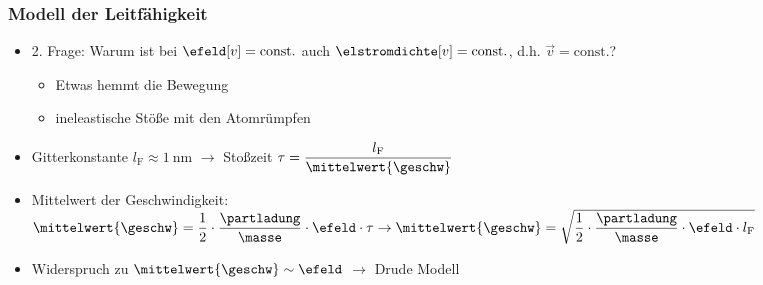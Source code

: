 \begin{frame}
  \frametitle{Modell der Leitfähigkeit}
\begin{itemize}[<+->]      
\item 2. Frage: Warum ist bei $\efeld[v] = \text{const.}$ auch $\elstromdichte[v] = \text{const.}$, d.h. $\vec{v} = \text{const.}$?
  \begin{itemize}[<+->]
  \item Etwas hemmt die Bewegung
  \item ineleastische Stöße mit den Atomrümpfen
    \end{itemize} 
\item Gitterkonstante \(l_\mathrm{F} \approx \SI{1}{\nano\metre} \) $\to$ Stoßzeit $
	\tau = \dfrac{l_\mathrm{F}}{\mittelwert{\geschw}}$

	\centerline{}

\item Mittelwert der Geschwindigkeit: $\mittelwert{\geschw} = \dfrac{1}{2} \cdot \dfrac{\partladung}{\masse} \cdot \efeld \cdot \tau \to
\mittelwert{\geschw} =  \sqrt{\dfrac{1}{2} \cdot \dfrac{\partladung}{\masse} \cdot \efeld \cdot l_\mathrm{F}}$
\item \alert{Widerspruch} zu \(\mittelwert{\geschw} \sim \efeld \) $\to$ \alert{Drude Modell}
  \end{itemize}

  
\end{frame}


